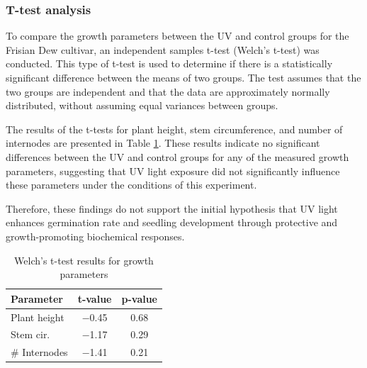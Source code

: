 \subsubsection{T-test analysis}

To compare the growth parameters between the UV and control groups for the Frisian Dew cultivar, an independent samples t-test (Welch's t-test) was conducted. This type of t-test is used to determine if there is a statistically significant difference between the means of two groups. The test assumes that the two groups are independent and that the data are approximately normally distributed, without assuming equal variances between groups.

The results of the t-tests for plant height, stem circumference, and number of internodes are presented in Table \ref{tab:ttest_results}. These results indicate no significant differences between the UV and control groups for any of the measured growth parameters, suggesting that UV light exposure did not significantly influence these parameters under the conditions of this experiment.

Therefore, these findings do not support the initial hypothesis that UV light enhances germination rate and seedling development through protective and growth-promoting biochemical responses.

\begin{table}[H]
    \caption{Welch's t-test results for growth parameters}
    \label{tab:ttest_results}
    \begin{tabularx}{\linewidth}{lcc}
        \toprule
        \textbf{Parameter} & \textbf{t-value} & \textbf{p-value} \\
        \midrule
        Plant height & \num[mode=text]{-0.45} & \num[mode=text]{0.68} \\
        Stem cir. & \num[mode=text]{-1.17} & \num[mode=text]{0.29} \\
        \# Internodes & \num[mode=text]{-1.41} & \num[mode=text]{0.21} \\
        \bottomrule
    \end{tabularx}
\end{table}